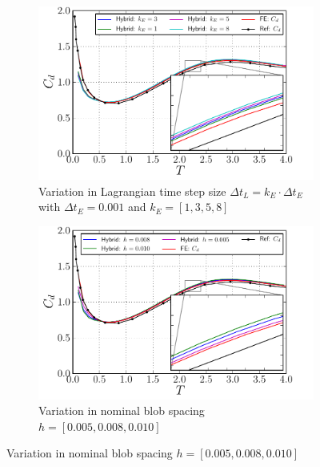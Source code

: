 	\begin{figure}[!p]
     \centering
     \begin{subfigure}[t]{0.7\textwidth}
             \includegraphics[width=\textwidth]{./figures/validation/isc/hybrid_ISC_drag_kE2.pdf}
             \caption{Variation in Lagrangian time step size $\Delta t_L = k_E\cdot \Delta t_E$ with $\Delta t_E = 0.001$ and $k_E = [1,3,5,8]$}
             \label{fig:hybrid_ISC_drag_kComparison}
     \end{subfigure}%
     \quad %
     \begin{subfigure}[t]{0.7\textwidth}
             \includegraphics[width=\textwidth]{./figures/validation/isc/hybrid_ISC_drag_nBlob2.pdf}
             \caption{Variation in nominal blob spacing $h = [0.005, 0.008, 0.010]$}
             \label{fig:hybrid_ISC_drag_nBlobComparison}
     \end{subfigure}

\end{figure}
